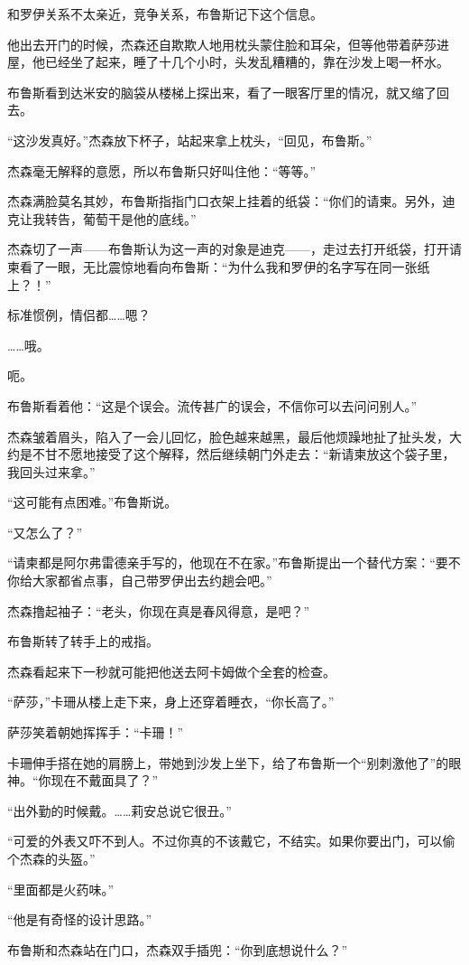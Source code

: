 \documentclass[../main]{subfiles}
\begin{document}
和罗伊关系不太亲近，竞争关系，布鲁斯记下这个信息。

他出去开门的时候，杰森还自欺欺人地用枕头蒙住脸和耳朵，但等他带着萨莎进屋，他已经坐了起来，睡了十几个小时，头发乱糟糟的，靠在沙发上喝一杯水。

布鲁斯看到达米安的脑袋从楼梯上探出来，看了一眼客厅里的情况，就又缩了回去。

“这沙发真好。”杰森放下杯子，站起来拿上枕头，“回见，布鲁斯。”

杰森毫无解释的意愿，所以布鲁斯只好叫住他：“等等。”

杰森满脸莫名其妙，布鲁斯指指门口衣架上挂着的纸袋：“你们的请柬。另外，迪克让我转告，葡萄干是他的底线。”

杰森切了一声——布鲁斯认为这一声的对象是迪克——，走过去打开纸袋，打开请柬看了一眼，无比震惊地看向布鲁斯：“为什么我和罗伊的名字写在同一张纸上？！”

标准惯例，情侣都……嗯？

……哦。

呃。

布鲁斯看着他：“这是个误会。流传甚广的误会，不信你可以去问问别人。”

杰森皱着眉头，陷入了一会儿回忆，脸色越来越黑，最后他烦躁地扯了扯头发，大约是不甘不愿地接受了这个解释，然后继续朝门外走去：“新请柬放这个袋子里，我回头过来拿。”

“这可能有点困难。”布鲁斯说。

“又怎么了？”

“请柬都是阿尔弗雷德亲手写的，他现在不在家。”布鲁斯提出一个替代方案：“要不你给大家都省点事，自己带罗伊出去约趟会吧。”

杰森撸起袖子：“老头，你现在真是春风得意，是吧？”

布鲁斯转了转手上的戒指。

杰森看起来下一秒就可能把他送去阿卡姆做个全套的检查。

“萨莎，”卡珊从楼上走下来，身上还穿着睡衣，“你长高了。”

萨莎笑着朝她挥挥手：“卡珊！”

卡珊伸手搭在她的肩膀上，带她到沙发上坐下，给了布鲁斯一个“别刺激他了”的眼神。“你现在不戴面具了？”

“出外勤的时候戴。……莉安总说它很丑。”

“可爱的外表又吓不到人。不过你真的不该戴它，不结实。如果你要出门，可以偷个杰森的头盔。”

“里面都是火药味。”

“他是有奇怪的设计思路。”

布鲁斯和杰森站在门口，杰森双手插兜：“你到底想说什么？”
\end{document}

